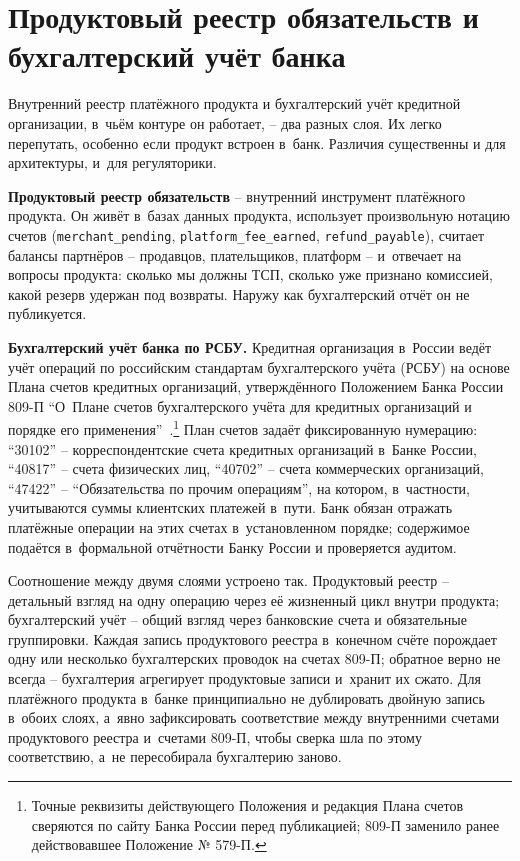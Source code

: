 \section{Продуктовый реестр обязательств и бухгалтерский учёт банка}\label{sec:ledger-vs-accounting}

Внутренний реестр платёжного продукта и бухгалтерский учёт
кредитной организации, в~чьём контуре он работает, -- два разных
слоя. Их легко перепутать, особенно если продукт встроен в~банк.
Различия существенны и для архитектуры, и~для регуляторики.

\textbf{Продуктовый реестр обязательств} -- внутренний инструмент
платёжного продукта. Он живёт в~базах данных продукта, использует
произвольную нотацию счетов (\texttt{merchant\_pending},
\texttt{platform\_fee\_earned}, \texttt{refund\_payable}), считает
балансы партнёров -- продавцов, плательщиков, платформ -- и~отвечает
на вопросы продукта: сколько мы должны ТСП, сколько уже признано
комиссией, какой резерв удержан под возвраты. Наружу как
бухгалтерский отчёт он не публикуется.

\textbf{Бухгалтерский учёт банка по РСБУ.} Кредитная организация
в~России ведёт учёт операций по российским стандартам бухгалтерского
учёта (РСБУ) на основе Плана счетов кредитных организаций,
утверждённого Положением Банка России 809-П \enquote{О~Плане счетов
бухгалтерского учёта для кредитных организаций и порядке его
применения}~\cite{cbr-809p}.\footnote{Точные реквизиты действующего
Положения и редакция Плана счетов сверяются по сайту Банка России
перед публикацией; 809-П заменило ранее действовавшее Положение
№ 579-П.} План счетов задаёт фиксированную нумерацию: \enquote{30102} --
корреспондентские счета кредитных организаций в~Банке России,
\enquote{40817} -- счета физических лиц, \enquote{40702} -- счета
коммерческих организаций, \enquote{47422} -- \enquote{Обязательства
по прочим операциям}, на котором, в~частности, учитываются суммы
клиентских платежей в~пути. Банк обязан отражать платёжные операции
на этих счетах в~установленном порядке; содержимое подаётся
в~формальной отчётности Банку России и проверяется аудитом.

Соотношение между двумя слоями устроено так. Продуктовый реестр --
детальный взгляд на одну операцию через её жизненный цикл внутри
продукта; бухгалтерский учёт -- общий взгляд через банковские счета
и обязательные группировки. Каждая запись продуктового реестра
в~конечном счёте порождает одну или несколько бухгалтерских проводок
на счетах 809-П; обратное верно не всегда -- бухгалтерия агрегирует
продуктовые записи и~хранит их сжато. Для платёжного продукта в~банке
принципиально не дублировать двойную запись в~обоих слоях, а~явно
зафиксировать соответствие между внутренними счетами продуктового
реестра и~счетами 809-П, чтобы сверка шла по этому соответствию,
а~не пересобирала бухгалтерию заново.

